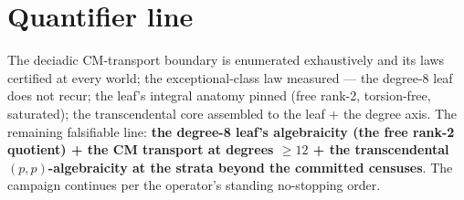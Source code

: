 \documentclass[11pt]{article}
\begin{document}
\section*{Quantifier line}

The deciadic CM-transport boundary is enumerated exhaustively and its laws
certified at every world; the exceptional-class law measured --- the
degree-8 leaf does not recur; the leaf's integral anatomy pinned (free
rank-2, torsion-free, saturated); the transcendental core assembled to the
leaf + the degree axis. The remaining falsifiable line: \textbf{the degree-8
leaf's algebraicity (the free rank-2 quotient) + the CM transport at degrees
$\ge 12$ + the transcendental $(p,p)$-algebraicity at the strata beyond the
committed censuses}. The campaign continues per the operator's standing
no-stopping order.
\end{document}
